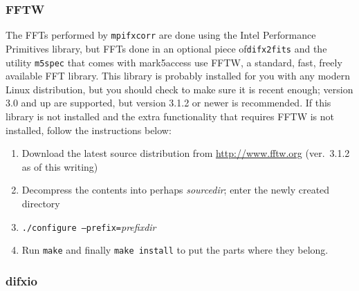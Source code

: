 
\subsubsection{FFTW} \label{sec:fftw}

The FFTs performed by {\tt mpifxcorr} are done using the Intel Performance Primitives library, but FFTs done in an optional piece of{\tt difx2fits} and the utility {\tt m5spec} that comes with mark5access use FFTW, a standard, fast, freely available FFT library.
This library is probably installed for you with any modern Linux distribution, but you should check to make sure it is recent enough; version 3.0 and up are supported, but version 3.1.2 or newer is recommended.
If this library is not installed and the extra functionality that requires FFTW is not installed, follow the instructions below:
\begin{enumerate}
\item Download the latest source distribution from \url{http://www.fftw.org} (ver.\ 3.1.2 as of this writing)
\item Decompress the contents into perhaps {\em sourcedir}; enter the newly created directory
\item {\tt ./configure --prefix=}{\em prefixdir}
\item Run {\tt make} and finally {\tt make install} to put the parts where they belong.
\end{enumerate}


















\subsubsection{difxio} \label{sec:difxio}

